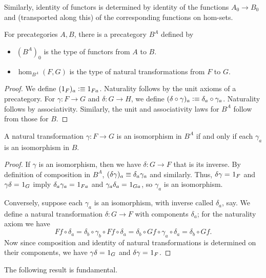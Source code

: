 Similarly, identity of functors is determined by identity of the functions $A_0\to B_0$ and (transported along this) of the corresponding functions on hom-sets.

\begin{defn}\label{ct:functor-precat}
  For precategories $A,B$, there is a precategory $B^A$ defined by
  \begin{itemize}
  \item $(B^A)_0$ is the type of functors from $A$ to $B$.
  \item $\hom_{B^A}(F,G)$ is the type of natural transformations from $F$ to $G$.
  \end{itemize}
\end{defn}
\begin{proof}
  We define $(1_F)_a\vcentcolon\equiv 1_{Fa}$.
  Naturality follows by the unit axioms of a precategory.
  For $\gamma:F\to G$ and $\delta:G\to H$, we define $(\delta\circ\gamma)_a\vcentcolon\equiv \delta_a\circ \gamma_a$.
  Naturality follows by associativity.
  Similarly, the unit and associativity laws for $B^A$ follow from those for $B$.
\end{proof}

\begin{lem}\label{ct:natiso}
  A natural transformation $\gamma:F\to G$ is an isomorphism in $B^A$ if and only if each $\gamma_a$ is an isomorphism in $B$.
\end{lem}
\begin{proof}
  If $\gamma$ is an isomorphism, then we have $\delta:G\to F$ that is its inverse.
  By definition of composition in $B^A$, $(\delta\gamma)_a\equiv \delta_a\gamma_a$ and similarly.
  Thus, $\delta\gamma =_{} 1_F$ and $\gamma\delta =_{} 1_G$ imply $\delta_a\gamma_a =_{} 1_{Fa}$ and $\gamma_a\delta_a =_{} 1_{Ga}$, so $\gamma_a$ is an isomorphism.

  Conversely, suppose each $\gamma_a$ is an isomorphism, with inverse called $\delta_a$, say.
We define a natural transformation $\delta:G\to F$ with components $\delta_a$; for the naturality axiom we have
  \[ Ff\circ \delta_a = \delta_b\circ \gamma_b\circ Ff \circ \delta_a = \delta_b\circ Gf\circ \gamma_a\circ \delta_a = \delta_b\circ Gf. \]
  Now since composition and identity of natural transformations is determined on their components, we have $\gamma\delta =_{} 1_G$ and $\delta\gamma =_{} 1_F$.
\end{proof}

The following result is fundamental.

